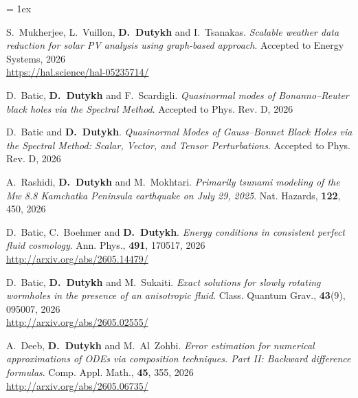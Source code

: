 \listpartsep = 1ex

\begin{etaremune}



  \item S.~Mukherjee, L.~Vuillon, \textbf{D.~Dutykh} and I.~Tsanakas. \textit{Scalable weather data reduction for solar PV analysis using graph-based approach}. Accepted to Energy Systems, 2026 \\ %
  \url{https://hal.science/hal-05235714/}

  \item D.~Batic, \textbf{D.~Dutykh} and F.~Scardigli. \textit{Quasinormal modes of Bonanno--Reuter black holes via the Spectral Method}. Accepted to Phys. Rev. D, 2026 %

  \item D.~Batic and \textbf{D.~Dutykh}. \textit{Quasinormal Modes of Gauss--Bonnet Black Holes via the Spectral Method: Scalar, Vector, and Tensor Perturbations}. Accepted to Phys. Rev. D, 2026 %

  \item A.~Rashidi, \textbf{D.~Dutykh} and M.~Mokhtari. \textit{Primarily tsunami modeling of the Mw 8.8 Kamchatka Peninsula earthquake on July 29, 2025}. Nat. Hazards, \textbf{122}, 450, 2026 %

  \item D.~Batic, C.~Boehmer and \textbf{D.~Dutykh}. \textit{Energy conditions in consistent perfect fluid cosmology}. Ann. Phys., \textbf{491}, 170517, 2026 \\ %
  \url{http://arxiv.org/abs/2605.14479/}
  
  \item D.~Batic, \textbf{D.~Dutykh} and M.~Sukaiti. \textit{Exact solutions for slowly rotating wormholes in the presence of an anisotropic fluid}. Class. Quantum Grav., \textbf{43}(9), 095007, 2026 \\ %
  \url{http://arxiv.org/abs/2605.02555/}

  \item A.~Deeb, \textbf{D.~Dutykh} and M.~Al~Zohbi.  \textit{Error estimation for numerical approximations of ODEs via composition techniques. Part II: Backward difference formulas}. Comp. Appl. Math., \textbf{45}, 355, 2026 \\ %
  \url{http://arxiv.org/abs/2605.06735/}
  

\end{etaremune}
